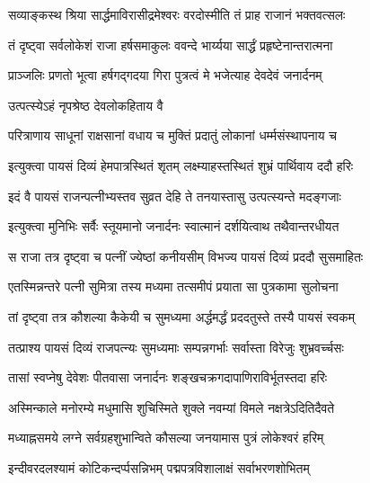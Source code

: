 \twolineshloka
{सव्याङ्कस्थ श्रिया सार्द्धमाविरासीद्रमेश्वरः}
{वरदोस्मीति तं प्राह राजानं भक्तवत्सलः}%

\twolineshloka
{तं दृष्ट्वा सर्वलोकेशं राजा हर्षसमाकुलः}
{ववन्दे भार्य्यया सार्द्धं प्रहृष्टेनान्तरात्मना}%

\twolineshloka
{प्राञ्जलिः प्रणतो भूत्वा हर्षगद्गदया गिरा}
{पुत्रत्वं मे भजेत्याह देवदेवं जनार्दनम्}%


\onelineshloka
{उत्पत्स्येऽहं नृपश्रेष्ठ देवलोकहिताय वै}%

\twolineshloka
{परित्राणाय साधूनां राक्षसानां वधाय च}
{मुक्तिं प्रदातुं लोकानां धर्म्मसंस्थापनाय च}%


\twolineshloka
{इत्युक्त्वा पायसं दिव्यं हेमपात्रस्थितं शृतम्}
{लक्ष्म्याहस्तस्थितं शुभ्रं पार्थिवाय ददौ हरिः}%


\twolineshloka
{इदं वै पायसं राजन्पत्नीभ्यस्तव सुव्रत}
{देहि ते तनयास्तासु उत्पत्स्यन्ते मदङ्गजाः}%


\twolineshloka
{इत्युक्त्वा मुनिभिः सर्वैः स्तूयमानो जनार्दनः}
{स्वात्मानं दर्शयित्वाथ तथैवान्तरधीयत}%

\twolineshloka
{स राजा तत्र दृष्ट्वा च पत्नीं ज्येष्ठां कनीयसीम्}
{विभज्य पायसं दिव्यं प्रददौ सुसमाहितः}%

\twolineshloka
{एतस्मिन्नन्तरे पत्नी सुमित्रा तस्य मध्यमा}
{तत्समीपं प्रयाता सा पुत्रकामा सुलोचना}%

\twolineshloka
{तां दृष्ट्वा तत्र कौशल्या कैकेयी च सुमध्यमा}
{अर्द्धमर्द्धं प्रददतुस्ते तस्यै पायसं स्वकम्}%

\twolineshloka
{तत्प्राश्य पायसं दिव्यं राजपत्न्यः सुमध्यमाः}
{सम्पन्नगर्भाः सर्वास्ता विरेजुः शुभ्रवर्च्चसः}%

\twolineshloka
{तासां स्वप्नेषु देवेशः पीतवासा जनार्दनः}
{शङ्खचक्रगदापाणिराविर्भूतस्तदा हरिः}%

\twolineshloka
{अस्मिन्काले मनोरम्ये मधुमासि शुचिस्मिते}
{शुक्ले नवम्यां विमले नक्षत्रेऽदितिदैवते}%

\twolineshloka
{मध्याह्नसमये लग्ने सर्वग्रहशुभान्विते}
{कौसल्या जनयामास पुत्रं लोकेश्वरं हरिम्}%

\twolineshloka
{इन्दीवरदलश्यामं कोटिकन्दर्प्पसन्निभम्}
{पद्मपत्रविशालाक्षं सर्वाभरणशोभितम्}%

